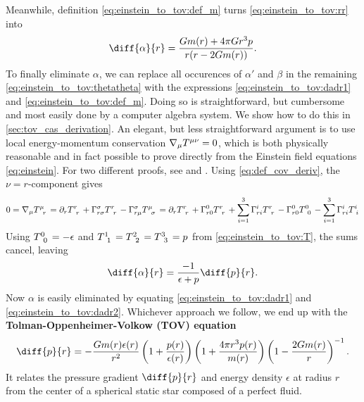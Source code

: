 Meanwhile, definition \eqref{eq:einstein_to_tov:def_m} turns \cref{eq:einstein_to_tov:rr} into
\begin{equation}
	\diff{\alpha}{r} = \frac{G m(r) + 4 \pi G r^3 p}{r (r - 2 G m(r))} .
	\label{eq:einstein_to_tov:dadr1}
\end{equation}
To finally eliminate $\alpha$, we can replace all occurences of $\alpha'$ and $\beta$ in the remaining \cref{eq:einstein_to_tov:thetatheta} with the expressions \eqref{eq:einstein_to_tov:dadr1} and \eqref{eq:einstein_to_tov:def_m}.
Doing so is straightforward, but cumbersome and most easily done by a computer algebra system.
We show how to do this in \cref{sec:tov_cas_derivation}.
An elegant, but less straightforward argument is to use local energy-momentum conservation $\nabla_\mu T\indices{^\mu^\nu} = 0$, which is both physically reasonable and in fact possible to prove directly from the Einstein field equations \eqref{eq:einstein}.
For two different proofs, see \cite{ref:einstein_conservation_energy_momentum} and \cite[section 8.3.2]{ref:mika_gr_notes}.
Using \cref{eq:def_cov_deriv}, the $\nu=r$-component gives
\begin{equation*}
	0
	= \nabla_\mu T\indices{^\mu_r}
	= \partial_r T\indices{^r_r} + \Gamma^\sigma_{r \sigma} T\indices{^r_r} - \Gamma^\sigma_{r \mu} T\indices{^\mu_\sigma}
	= \partial_r T\indices{^r_r} + \Gamma^0_{r0} T\indices{^r_r} + \sum_{i=1}^3 \Gamma^i_{ri} T\indices{^r_r} - \Gamma^0_{r0} T\indices{^0_0} - \sum_{i=1}^3 \Gamma^i_{ri} T\indices{^i_i}
\end{equation*}
Using $T\indices{^0_0} = -\epsilon$ and $T\indices{^1_1} = T\indices{^2_2} = T\indices{^3_3} = p$ from \cref{eq:einstein_to_tov:T}, the sums cancel, leaving
\begin{equation}
	\diff{\alpha}{r} = \frac{-1}{\epsilon+p} \diff{p}{r} .
	\label{eq:einstein_to_tov:dadr2}
\end{equation}
Now $\alpha$ is easily eliminated by equating \eqref{eq:einstein_to_tov:dadr1} and \eqref{eq:einstein_to_tov:dadr2}. 
Whichever approach we follow, we end up with the \textbf{Tolman-Oppenheimer-Volkow (TOV) equation}
\begin{equation}
	\diff{p}{r} = -\frac{G m(r) \epsilon(r)}{r^2} \left( 1 + \frac{p(r)}{\epsilon(r)} \right) \left( 1 + \frac{4 \pi r^3 p(r)}{m(r)} \right) \left( 1 - \frac{2 G m(r)}{r} \right)^{-1} .
	\label{eq:tov}
\end{equation}
It relates the pressure gradient $\diff{p}{r}$ and energy density $\epsilon$ at radius $r$ from the center of a spherical static star composed of a perfect fluid.
